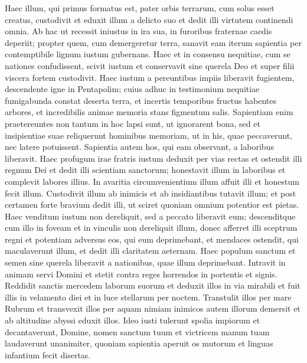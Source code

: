 \begin{biblechapter}  
\verse Haec illum, qui primus formatus est, pater orbis terrarum, cum solus esset creatus, custodivit et eduxit illum a delicto suo 
\verse et dedit illi virtutem continendi omnia. 
\verse Ab hac ut recessit iniustus in ira sua, in furoribus fraternae caedis deperiit; 
\verse propter quem, cum demergeretur terra, sanavit eam iterum sapientia per contemptibile lignum iustum gubernans. 
\verse Haec et in consensu nequitiae, cum se nationes confudissent, scivit iustum et conservavit sine querela Deo et super filii viscera fortem custodivit. 
\verse Haec iustum a pereuntibus impiis liberavit fugientem, descendente igne in Pentapolim; 
\verse cuius adhuc in testimonium nequitiae fumigabunda constat deserta terra, et incertis temporibus fructus habentes arbores, et incredibilis animae memoria stans figmentum salis. 
\verse Sapientiam enim praetereuntes non tantum in hoc lapsi sunt, ut ignorarent bona, sed et insipientiae suae reliquerunt hominibus memoriam, ut in his, quae peccaverunt, nec latere potuissent. 
\verse Sapientia autem hos, qui eam observant, a laboribus liberavit. 
\verse Haec profugum irae fratris iustum deduxit per vias rectas et ostendit illi regnum Dei et dedit illi scientiam sanctorum; honestavit illum in laboribus et complevit labores illius. 
\verse In avaritia circumvenientium illum affuit illi et honestum fecit illum. 
\verse Custodivit illum ab inimicis et ab insidiantibus tutavit illum; et post certamen forte bravium dedit illi, ut sciret quoniam omnium potentior est pietas. 
\verse Haec venditum iustum non dereliquit, sed a peccato liberavit eum; 
\verse descenditque cum illo in foveam et in vinculis non dereliquit illum, donec afferret illi sceptrum regni et potentiam adversus eos, qui eum deprimebant, et mendaces ostendit, qui maculaverunt illum, et dedit illi claritatem aeternam. 
\verse Haec populum sanctum et semen sine querela liberavit a nationibus, quae illum deprimebant. 
\verse Intravit in animam servi Domini et stetit contra reges horrendos in portentis et signis. 
\verse Reddidit sanctis mercedem laborum suorum et deduxit illos in via mirabili et fuit illis in velamento diei et in luce stellarum per noctem. 
\verse Transtulit illos per mare Rubrum et transvexit illos per aquam nimiam 
\verse inimicos autem illorum demersit et ab altitudine abyssi eduxit illos. 
\verse Ideo iusti tulerunt spolia impiorum et decantaverunt, Domine, nomen sanctum tuum et victricem manum tuam laudaverunt unanimiter, 
\verse quoniam sapientia aperuit os mutorum et linguas infantium fecit disertas. 
\end{biblechapter}


